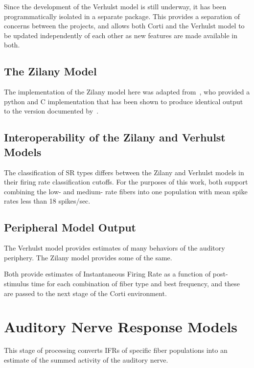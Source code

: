Since the development of the Verhulst model is still underway, it has been programmatically isolated in a separate package.  This provides a separation of concerns between the projects, and allows both Corti and the Verhulst model to be updated independently of each other as new features are made available in both.
\subsection{The Zilany Model} %
\label{sub:the_zilany_model}
The implementation of the Zilany model here was adapted from~\cite{Rudnicki2014Cochlea}, who provided a python and C implementation that has been shown to produce identical output to the version documented by~\cite{Zilany2014Updated}. 

\subsection{Interoperability of the Zilany and Verhulst Models} %
\label{sub:interoperability_of_the_zilany_and_verhulst_models}
The classification of SR types differs between the Zilany and Verhulst models in their firing rate classification cutoffs.  For the purposes of this work, both support combining the low- and medium- rate fibers into one population with mean spike rates less than 18 spikes/sec.  



\subsection{Peripheral Model Output} %
\label{sub:peripheral_model_output}
The Verhulst model provides estimates of many behaviors of the auditory periphery.  The Zilany model provides some of the same. 

Both provide estimates of Instantaneous Firing Rate as a function of post-stimulus time for each combination of fiber type and best frequency, and these are passed to the next stage of the Corti environment.


\section{Auditory Nerve Response Models} %
\label{sec:auditory_nerve_response_models}
This stage of processing converts IFRs of specific fiber populations into an estimate of the summed activity of the auditory nerve. 

